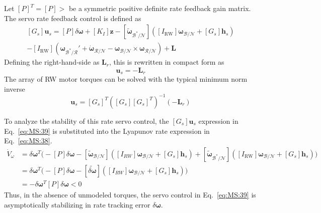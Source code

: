 \documentclass[]{BasiliskReportMemo}
\begin{document}
Let $[P]^{T} = [P]>$ be a symmetric positive definite rate feedback gain matrix.  The servo rate feedback control is defined as
\begin{multline}
	\label{eq:MS:39}
	[G_{s}]\bm u_{s} = [P]\delta\bm\omega + [K_{I}]\bm z - [\tilde{\bm\omega}_{\mathcal{B}^{\ast}/\mathcal{N}}] 
	\left( [I_{\text{RW}}] \bm\omega_{\mathcal{B}/\mathcal{N}} + [G_{s}] \bm h_{s} \right)
	\\
	- [I_{\text{RW}}](\bm\omega_{\mathcal{B}^{\ast}/\mathcal{R}} ' +  \dot{\bm\omega}_{\mathcal{R}/\mathcal{N}} -  {\bm\omega}_{\mathcal{B}/\mathcal{N}} \times  \bm\omega_{\mathcal{R}/\mathcal{N}}) + \bm L
\end{multline}
Defining the right-hand-side as $\bm L_{r}$, this is rewritten in compact form as
\begin{equation}
	[G_{s}]\bm u_{s} = -\bm L_{r}
\end{equation}
The array of RW motor torques can be solved with the typical minimum norm inverse
\begin{equation}
	\bm u_{s} = [G_{s}]^{T}\left( [G_{s}][G_{s}]^{T}\right)^{-1}(- \bm L_{r})
\end{equation}


To analyze the stability of this rate servo control, the $[G_{s}]\bm u_{s}$ expression in Eq.~\eqref{eq:MS:39} is substituted into the Lyapunov rate expression in Eq.~\eqref{eq:MS:38}.
\begin{align}
	\label{eq:MS:42}
	\dot V_{\omega} &= \delta\bm\omega^{T} \Big(
		- [P]\delta\bm\omega - [\tilde{\bm \omega}_{\mathcal{B}/\mathcal{N}}] \left( 
	[I_{RW}] \bm\omega_{\mathcal{B}/\mathcal{N}} + [G_{s}] \bm h_{s} 
	\right) 
	+ [\tilde{\bm\omega}_{\mathcal{B}^{\ast}/\mathcal{N}}] 
	\left( [I_{\text{RW}}] \bm\omega_{\mathcal{B}/\mathcal{N}} + [G_{s}] \bm h_{s} \right)
	\Big ) 
	\nonumber \\
	&= \delta\bm\omega^{T} \Big( - [P]\delta\bm\omega
	- [\widetilde{\delta\bm \omega}] \left( 
	[I_{RW}] \bm\omega_{\mathcal{B}/\mathcal{N}} + [G_{s}] \bm h_{s} 
	\right) 
	\Big )
	\nonumber \\
	&= - \delta\bm\omega ^{T} [P] \delta\bm\omega < 0
\end{align}
Thus, in the absence of unmodeled torques, the servo control in Eq.~\eqref{eq:MS:39} is asymptotically stabilizing in rate tracking error $\delta\bm\omega$.  
\end{document}
